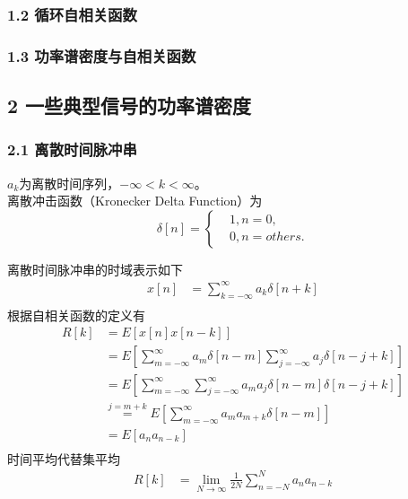 \documentclass[
]{article}
\begin{document}
\hypertarget{header-n12}{%
\subsubsection{1.2 循环自相关函数}\label{header-n12}}

\hypertarget{header-n13}{%
\subsubsection{1.3 功率谱密度与自相关函数}\label{header-n13}}

\hypertarget{header-n16}{%
\subsection{2 一些典型信号的功率谱密度}\label{header-n16}}

\hypertarget{header-n21}{%
\subsubsection{2.1 离散时间脉冲串}\label{header-n21}}
$a_k$为离散时间序列，$-\infty<k<\infty$。\\
离散冲击函数（Kronecker Delta Function）为
\begin{equation}
\delta[n] =\left\{
\begin{aligned}
&1, n=0, \\
&0, n=others.
\end{aligned}
\right.
\end{equation}

离散时间脉冲串的时域表示如下
\begin{equation}
\begin{aligned}
x[n] &= \sum\limits_{k=-\infty}^{\infty} a_k \delta[n+k] \\
\end{aligned}
\end{equation}
根据自相关函数的定义有
\begin{equation}
\begin{aligned}
R[k] &= E[x[n]x[n-k]]\\
&= E[\sum\limits_{m=-\infty}^{\infty} a_m \delta[n-m] \sum\limits_{j=-\infty}^{\infty} a_j \delta[n-j+k]]\\
&= E[\sum\limits_{m=-\infty}^{\infty} \sum\limits_{j=-\infty}^{\infty} a_m a_j \delta[n-m] \delta[n-j+k]]\\
&\overset{j=m+k}= E[\sum\limits_{m=-\infty}^{\infty} a_m a_{m+k} \delta[n-m]]\\
&= E[a_n a_{n-k}]\\
\end{aligned}
\end{equation}
时间平均代替集平均 \\
\begin{equation}
\begin{aligned}
R[k] &= \lim\limits_{N \to \infty} \frac{1}{2N}\sum\limits_{n=-N}^{N} a_n a_{n-k}\\
\end{aligned}
\end{equation}
\end{document}
